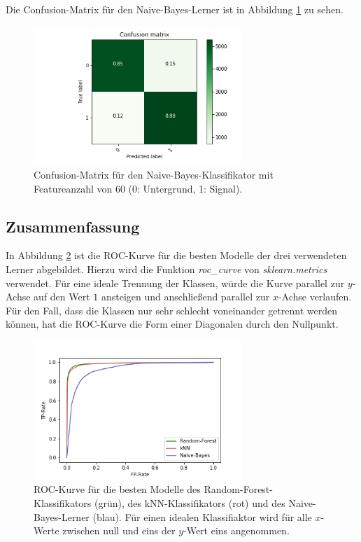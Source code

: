   \FloatBarrier
  Die Confusion-Matrix für den Naive-Bayes-Lerner ist in Abbildung \ref{fig:NB_conf} zu sehen.
  \begin{figure}
    \centering
    \includegraphics[width=0.7\textwidth]{plots/NB_confusion.png}
    \caption{Confusion-Matrix für den Naive-Bayes-Klassifikator mit Featureanzahl von 60 (0: Untergrund, 1: Signal).}
    \label{fig:NB_conf}
  \end{figure}
  \FloatBarrier

  \subsection{Zusammenfassung}
  In Abbildung \ref{fig:roc} ist die ROC-Kurve für die besten Modelle der drei verwendeten Lerner abgebildet. Hierzu wird die Funktion \textit{roc\_curve} von \textit{sklearn.metrics} verwendet. Für eine ideale Trennung der Klassen, würde die Kurve parallel zur $y$-Achse auf den Wert $1$ ansteigen und anschließend parallel zur $x$-Achse verlaufen. Für den Fall, dass die Klassen nur sehr schlecht voneinander getrennt werden können, hat die ROC-Kurve die Form einer Diagonalen durch den Nullpunkt.
  \begin{figure}
    \centering
    \includegraphics[width=0.7\textwidth]{plots/roc_kurve.png}
    \caption{ROC-Kurve für die besten Modelle des Random-Forest-Klassifikators (grün), des kNN-Klassifikators (rot) und des Naive-Bayes-Lerner (blau). Für einen idealen Klassifiaktor wird für alle $x$- Werte zwischen null und eins der $y$-Wert eins angenommen.}
    \label{fig:roc}
  \end{figure}
  \FloatBarrier
